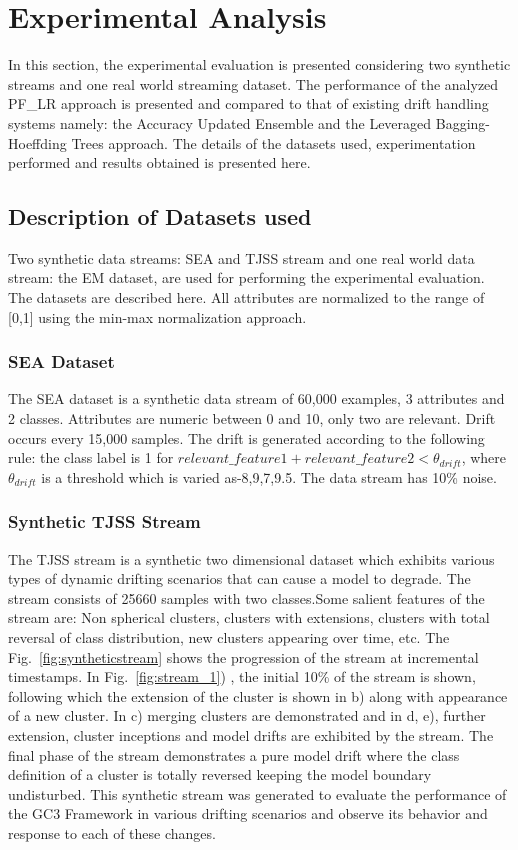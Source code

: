 \documentclass[conference]{IEEEtran}
\begin{document}
\section{Experimental Analysis}
In this section, the experimental evaluation is presented considering two synthetic streams and one real world streaming dataset. The performance of the analyzed PF\_LR approach is presented and compared to that of existing drift handling systems namely: the Accuracy Updated Ensemble and the Leveraged Bagging-Hoeffding Trees approach. The details of the datasets used, experimentation performed and results obtained is presented here.

\subsection{Description of Datasets used}
Two synthetic data streams: SEA \cite{Street and Kim(2001)} and TJSS stream and one real world data stream: the EM dataset\cite{Harries and Wales (1999)}\cite{Gong-De etal(2012)}, are used for performing the experimental evaluation. The datasets are described here. All attributes are normalized to the range of [0,1] using the min-max normalization approach.

\subsubsection{SEA Dataset}
The SEA dataset is a synthetic data stream of 60,000 examples, 3 attributes and 2 classes. Attributes are numeric between 0 and 10, only two are relevant. Drift occurs every 15,000 samples. The drift is generated according to the following rule: the class label is 1 for $relevant\_feature1+relevant\_feature2 < \theta_{drift}$, where $\theta_{drift}$ is a threshold which is varied as-{8,9,7,9.5}. The data stream has 10\% noise. 

\subsubsection{Synthetic TJSS Stream }
\label{sec:syntheticstream}

The TJSS stream is a synthetic two dimensional dataset which exhibits various types of dynamic drifting scenarios that can cause a model to degrade. The stream consists of 25660 samples with two classes.Some salient features of the stream are: Non spherical clusters, clusters with extensions, clusters with total reversal of class distribution, new clusters appearing over time, etc. The Fig.~\ref{fig:syntheticstream} shows the progression of the stream at incremental timestamps. In Fig.~\ref{fig:stream_1}) , the initial 10\% of the stream is shown, following which the extension of the cluster is shown in b) along with appearance of a new cluster. In c) merging clusters are demonstrated and in d, e), further extension, cluster inceptions and model drifts are exhibited by the stream. The final phase of the stream demonstrates a pure model drift where the class definition of a cluster is totally reversed keeping the model boundary undisturbed. This synthetic stream was generated to evaluate the performance of the GC3 Framework in various drifting scenarios and observe its behavior and response to each of these changes.
\end{document}
